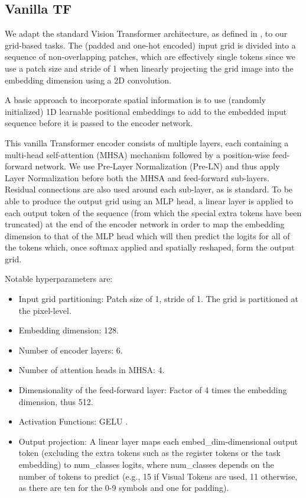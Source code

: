 \subsection{Vanilla TF} \label{sec:vanilla_vit_model_details_appendix}
We adapt the standard Vision Transformer architecture, as defined in \citep{dosovitskiy2021an}, to our grid-based tasks. The (padded and one-hot encoded) input grid is divided into a sequence of non-overlapping patches, which are effectively single tokens since we use a patch size and stride of 1 when linearly projecting the grid image into the embedding dimension using a 2D convolution.

A basic approach to incorporate spatial information is to use (randomly initialized) 1D learnable positional embeddings to add to the embedded input sequence before it is passed to the encoder network.

This vanilla Transformer encoder consists of multiple layers, each containing a multi-head self-attention (MHSA) mechanism followed by a position-wise feed-forward network. We use Pre-Layer Normalization (Pre-LN) \citep{wang2019learningdeeptransformermodels, xiong2020layernormalizationtransformerarchitecture} and thus apply Layer Normalization before both the MHSA and feed-forward sub-layers. Residual connections are also used around each sub-layer, as is standard. To be able to produce the output grid using an MLP head, a linear layer is applied to each output token of the sequence (from which the special extra tokens have been truncated) at the end of the encoder network in order to map the embedding dimension to that of the MLP head which will then predict the logits for all of the tokens which, once softmax applied and spatially reshaped, form the output grid.

Notable hyperparameters are:
    \begin{itemize}
        \item Input grid partitioning: Patch size of 1, stride of 1. The grid is partitioned at the pixel-level.

        \item Embedding dimension: 128.

        \item Number of encoder layers: 6.

        \item Number of attention heads in MHSA: 4.

        \item Dimensionality of the feed-forward layer: Factor of 4 times the embedding dimension, thus 512.

        \item Activation Functions: GELU \;\citep{hendrycks2023gaussianerrorlinearunits}.

        \item Output projection: A linear layer maps each embed\_dim-dimensional output token (excluding the extra tokens such as the register tokens or the task embedding) to num\_classes logits, where num\_classes depends on the number of tokens to predict (e.g., 15 if Visual Tokens are used, 11 otherwise, as there are ten for the 0-9 symbols and one for padding).
    \end{itemize}


